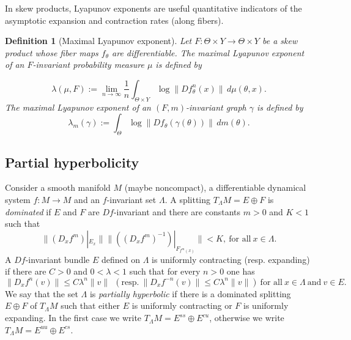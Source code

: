 \documentclass[11pt,reqno]{amsart}
\theoremstyle{plain}
\newtheorem{definition}[theorem]{Definition}
\newtheorem*{theorem A}{Theorem A}
\newtheorem*{theorem B}{Theorem B}
\newtheorem*{theorem C}{Theorem C}
\newtheorem*{theorem 1}{Theorem 1}
\newtheorem*{theorem 2}{Theorem 2}
\newtheorem*{theorem 3}{Theorem 3}
\numberwithin{equation}{section}
\begin{document}
In skew products, Lyapunov exponents  are  useful quantitative indicators of the asymptotic expansion and contraction rates (along  fibers).
\begin{definition}[Maximal Lyapunov exponent]\label{max}
Let $F :\Theta \times Y \to \Theta \times Y$  be a skew product whose fiber maps $f_\theta$ are differentiable. The {\em{maximal Lyapunov exponent of an $F$-invariant probability measure $\mu$}} is defined by

\begin{equation}\label{lya1}
 \lambda(\mu,F):=\lim_{n \to \infty}\frac{1}{n}\int_{\Theta \times Y} \log \|Df_\theta^{n}(x)\| \, d\mu(\theta,x).
\end{equation}
The {\em{maximal Lyapunov exponent of an $(F ,m)$-invariant graph $\gamma$}} is defined by
\begin{equation}\label{lya}
 \lambda_m(\gamma):=\int_{\Theta} \log \|Df_\theta(\gamma(\theta))\|\,dm(\theta).
\end{equation}
\end{definition}

\subsection{Partial hyperbolicity}
Consider a smooth manifold $M$ (maybe noncompact), a differentiable dynamical system $f:M \to M$ and an $f$-invariant set $\Lambda$. A splitting $T_{\Lambda}M=E\oplus F$ is \emph{dominated} if $E$ and $F$ are $Df$-invariant and there are constants $m>0$ and $K< 1$ such that
\begin{equation}\label{dom}
  \|(D_xf^m) |_{E_x}\| \|((D_xf^m)^{-1}) |_{F_{f^m(x)}}\|<K, \ \text{for \ all} \ x\in \Lambda.
\end{equation}
A $Df$-invariant bundle $E$ defined on $\Lambda$ is uniformly contracting (resp. expanding) if there are $C>0$ and $0< \lambda<1$ such that for every $n>0$ one has
\begin{equation}\label{ce}
  \|D_xf^n(v)\| \leq C\lambda^n \|v\| \ \ (\text{resp.} \ \|D_xf^{-n}(v)\| \leq C\lambda^n \|v\|) \ \text{for \ all} \ x\in \Lambda \ \text{and} \ v \in E.
\end{equation}
We say that the set $\Lambda$ is \emph{partially hyperbolic} if there is a dominated splitting
$E\oplus F$ of $T_{\Lambda}M$ such that either $E$ is uniformly contracting or $F$ is uniformly expanding.
In the first case we write $T_{\Lambda}M=E^{ss}\oplus E^{cu}$, otherwise we write $T_{\Lambda}M=E^{uu}\oplus E^{cs}$.
\end{document}
